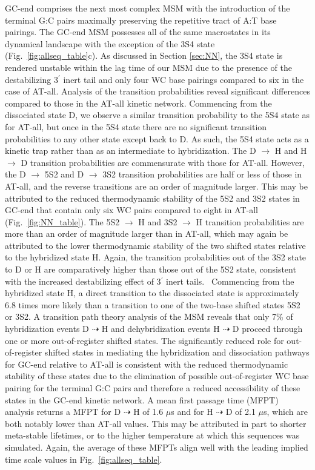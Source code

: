\documentclass[journal=jpcbfk,manuscript=article]{achemso}
\begin{document}
GC-end comprises the next most complex MSM with the introduction of the terminal G:C pairs maximally preserving the repetitive tract of A:T base pairings. The GC-end MSM possesses all of the same macrostates in its dynamical landscape with the exception of the 3S4 state (Fig.~\ref{fig:allseq_table}c). As discussed in Section \ref{sec:NN}, the 3S4 state is rendered unstable within the lag time of our MSM due to the presence of the destabilizing 3$^\prime$ inert tail and only four WC base pairings compared to six in the case of AT-all. Analysis of the transition probabilities reveal significant differences compared to those in the AT-all kinetic network. Commencing from the dissociated state D, we observe a similar transition probability to the 5S4 state as for AT-all, but once in the 5S4 state there are no significant transition probabilities to any other state except back to D. As such, the 5S4 state acts as a kinetic trap rather than as an intermediate to hybridization. The D $\rightarrow$ H and H $\rightarrow$ D transition probabilities are commensurate with those for AT-all. However, the D $\rightarrow$ 5S2 and D $\rightarrow$ 3S2 transition probabilities are half or less of those in AT-all, and the reverse transitions are an order of magnitude larger. This may be attributed to the reduced thermodynamic stability of the 5S2 and 3S2 states in GC-end that contain only six WC pairs compared to eight in AT-all (Fig.~\ref{fig:NN_table}). The 5S2 $\rightarrow$ H and 3S2 $\rightarrow$ H transition probabilities are more than an order of magnitude larger than in AT-all, which may again be attributed to the lower thermodynamic stability of the two shifted states relative to the hybridized state H. Again, the transition probabilities out of the 3S2 state to D or H are comparatively higher than those out of the 5S2 state, consistent with the increased destabilizing effect of 3$^\prime$ inert tails.~\citep{Doktycz1990ThermodynamicATGC, Dickman2012ThermodynamicDNAs, Michele2014EHybridization} Commencing from the hybridized state H, a direct transition to the dissociated state is approximately 6.8 times more likely than a transition to one of the two-base shifted states 5S2 or 3S2. A transition path theory analysis of the MSM reveals that only 7\% of hybridization events D $\dashrightarrow$ H and dehybridization events H $\dashrightarrow$ D proceed through one or more out-of-register shifted states. The significantly reduced role for out-of-register shifted states in mediating the hybridization and dissociation pathways for GC-end relative to AT-all is consistent with the reduced thermodynamic stability of these states due to the elimination of possible out-of-register WC base pairing for the terminal G:C pairs and therefore a reduced accessibility of these states in the GC-end kinetic network. A mean first passage time (MFPT) analysis returns a MFPT for D $\dashrightarrow$ H of 1.6 $\mu$s and for H $\dashrightarrow$ D of 2.1 $\mu$s, which are both notably lower than AT-all values. This may be attributed in part to shorter meta-stable lifetimes, or to the higher temperature at which this sequences was simulated. Again, the average of these MFPTs align well with the leading implied time scale values in Fig.~\ref{fig:allseq_table}.
\end{document}
